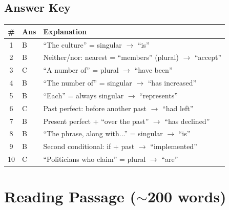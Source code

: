 \documentclass[10pt,a4paper]{article}
\begin{document}
\subsection*{Answer Key}

\begin{center}
\begin{tabular}{cll}
\toprule
\# & Ans & Explanation \\
\midrule
1 & B & ``The culture'' = singular $\to$ ``is'' \\
2 & B & Neither/nor: nearest = ``members'' (plural) $\to$ ``accept'' \\
3 & C & ``A number of'' = plural $\to$ ``have been'' \\
4 & B & ``The number of'' = singular $\to$ ``has increased'' \\
5 & B & ``Each'' = always singular $\to$ ``represents'' \\
6 & C & Past perfect: before another past $\to$ ``had left'' \\
7 & B & Present perfect + ``over the past'' $\to$ ``has declined'' \\
8 & B & ``The phrase, along with...'' = singular $\to$ ``is'' \\
9 & B & Second conditional: if + past $\to$ ``implemented'' \\
10 & C & ``Politicians who claim'' = plural $\to$ ``are'' \\
\bottomrule
\end{tabular}
\end{center}

\section*{Reading Passage ($\sim$200 words)}
\end{document}
